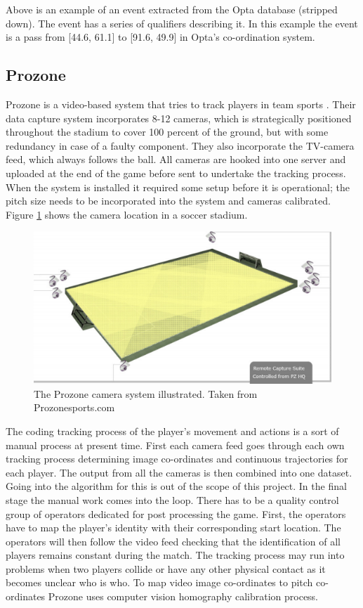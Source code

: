 Above is an example of an event extracted from the Opta database (stripped down). The event has a series of qualifiers describing it. In this example the event is a pass from [44.6, 61.1] to [91.6, 49.9] in Opta’s co-ordination system.

\subsection{Prozone}
\label{sec:prozone}
Prozone is a video-based system that tries to track players in team sports \cite{Prozone:indepth}. Their data capture system incorporates 8-12 cameras, which is strategically positioned throughout the stadium to cover 100 percent of the ground, but with some redundancy in case of a faulty component. They also incorporate the TV-camera feed, which always follows the ball. All cameras are hooked into one server and uploaded at the end of the game before sent to undertake the tracking process. When the system is installed it required some setup before it is operational; the pitch size needs to be incorporated into the system and cameras calibrated. Figure \ref{fig:prozonecam} shows the camera location in a soccer stadium.

\begin{figure}[ht!]
\centering
\includegraphics[width=1\textwidth]{images/general/prozonecam.png}
\caption{The Prozone camera system illustrated. Taken from Prozonesports.com}
\label{fig:prozonecam}
\end{figure}

The coding tracking process of the player's movement and actions is a sort of manual process at present time. First each camera feed goes through each own tracking process determining image co-ordinates and continuous trajectories for each player. The output from all the cameras is then combined into one dataset. Going into the algorithm for this is out of the scope of this project. In the final stage the manual work comes into the loop. There has to be a quality control group of operators dedicated for post processing the game. First, the operators have to map the player’s identity with their corresponding start location. The operators will then follow the video feed checking that the identification of all players remains constant during the match. The tracking process may run into problems when two players collide or have any other physical contact as it becomes unclear who is who. To map video image co-ordinates to pitch co-ordinates Prozone uses computer vision homography calibration process.


